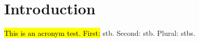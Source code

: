 
\section{Introduction} %
\label{sec:introduction}
\hl{This is an acronym test. First:} \gls{stb}. Second: \gls{stb}. Plural: \glspl{stb}.

